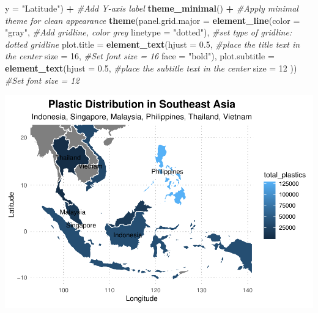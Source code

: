 \documentclass[
]{article}
\newenvironment{Shaded}{\begin{snugshade}}{\end{snugshade}}
\newcommand{\AttributeTok}[1]{\textcolor[rgb]{0.13,0.29,0.53}{#1}}
\newcommand{\CommentTok}[1]{\textcolor[rgb]{0.56,0.35,0.01}{\textit{#1}}}
\newcommand{\DecValTok}[1]{\textcolor[rgb]{0.00,0.00,0.81}{#1}}
\newcommand{\FloatTok}[1]{\textcolor[rgb]{0.00,0.00,0.81}{#1}}
\newcommand{\FunctionTok}[1]{\textcolor[rgb]{0.13,0.29,0.53}{\textbf{#1}}}
\newcommand{\NormalTok}[1]{#1}
\newcommand{\SpecialCharTok}[1]{\textcolor[rgb]{0.81,0.36,0.00}{\textbf{#1}}}
\newcommand{\StringTok}[1]{\textcolor[rgb]{0.31,0.60,0.02}{#1}}
\begin{document}
\begin{Shaded}
\begin{Highlighting}[]
       \AttributeTok{y =} \StringTok{"Latitude"}\NormalTok{) }\SpecialCharTok{+}                                  \CommentTok{\#Add Y{-}axis label}
  \FunctionTok{theme\_minimal}\NormalTok{() }\SpecialCharTok{+}                                       \CommentTok{\#Apply minimal theme for clean appearance}
  \FunctionTok{theme}\NormalTok{(}\AttributeTok{panel.grid.major =} \FunctionTok{element\_line}\NormalTok{(}\AttributeTok{color =} \StringTok{"gray"}\NormalTok{,       }\CommentTok{\#Add gridline, color grey}
                                        \AttributeTok{linetype =} \StringTok{"dotted"}\NormalTok{), }\CommentTok{\#set type of gridline: dotted gridline}
        \AttributeTok{plot.title =} \FunctionTok{element\_text}\NormalTok{(}\AttributeTok{hjust =} \FloatTok{0.5}\NormalTok{,     }\CommentTok{\#place the title text in the center}
                                  \AttributeTok{size =} \DecValTok{16}\NormalTok{,       }\CommentTok{\#Set font size = 16}
                                  \AttributeTok{face =} \StringTok{"bold"}\NormalTok{),}
        \AttributeTok{plot.subtitle =} \FunctionTok{element\_text}\NormalTok{(}\AttributeTok{hjust =} \FloatTok{0.5}\NormalTok{,  }\CommentTok{\#place the subtitle text in the center}
                                  \AttributeTok{size =} \DecValTok{12}\NormalTok{ ))     }\CommentTok{\#Set font size = 12}
\end{Highlighting}
\end{Shaded}

\includegraphics{../output/plastic_SEA-1.pdf}
\end{document}

